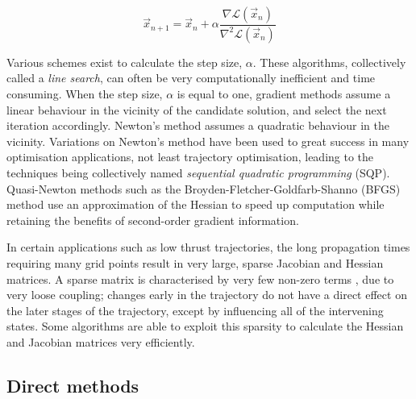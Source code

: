 \begin{equation} \label{eq:newtons-method}
\vec{x}_{n+1}=\vec{x}_n + \alpha\frac{\nabla\mathcal{L}(\vec{x}_n)}{\nabla^2\mathcal{L}(\vec{x}_n)}
\end{equation}

Various schemes exist to calculate the step size, $\alpha$. These algorithms, collectively called a \emph{line search}, can often be very computationally inefficient and time consuming. When the step size, $\alpha$ is equal to one, gradient methods assume a linear behaviour in the vicinity of the candidate solution, and select the next iteration accordingly. Newton's method assumes a quadratic behaviour in the vicinity. Variations on Newton's method have been used to great success in many optimisation applications, not least trajectory optimisation, leading to the techniques being collectively named \emph{sequential quadratic programming} (SQP). Quasi-Newton methods such as the Broyden-Fletcher-Goldfarb-Shanno (BFGS) method use an approximation of the Hessian to speed up computation while retaining the benefits of second-order gradient information. 

In certain applications such as low thrust trajectories, the long propagation times requiring many grid points result in very large, sparse Jacobian and Hessian matrices. A sparse matrix is characterised by very few non-zero terms \parencite{Stoer2002}, due to very loose coupling; changes early in the trajectory do not have a direct effect on the later stages of the trajectory, except by influencing all of the intervening states. Some algorithms are able to exploit this sparsity to calculate the Hessian and Jacobian matrices very efficiently.





\subsection{Direct methods}

